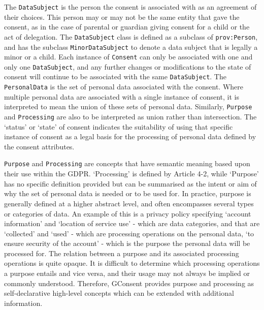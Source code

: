The \texttt{DataSubject} is the person the consent is associated with as an agreement of their choices. This person may or may not be the same entity that gave the consent, as in the case of parental or guardian giving consent for a child or the act of delegation. The \texttt{DataSubject} class is defined as a subclass of \texttt{prov:Person}, and has the subclass \texttt{MinorDataSubject} to denote a data subject that is legally a minor or a child.
Each instance of \texttt{Consent} can only be associated with one and only one \texttt{DataSubject}, and any further changes or modifications to the state of consent will continue to be associated with the same \texttt{DataSubject}.
The \texttt{PersonalData} is the set of personal data associated with the consent. Where multiple personal data are associated with a single instance of consent, it is interpreted to mean the union of these sets of personal data. Similarly, \texttt{Purpose} and \texttt{Processing} are also to be interpreted as union rather than intersection.
The `status' or `state' of consent indicates the suitability of using that specific instance of consent as a legal basis for the processing of personal data defined by the consent attributes.

\texttt{Purpose} and \texttt{Processing} are concepts that have semantic meaning based upon their use within the GDPR.
`Processing' is defined by Article 4-2, while `Purpose' has no specific definition provided but can be summarised as the intent or aim of why the set of personal data is needed or to be used for. In practice, purpose is generally defined at a higher abstract level, and often encompasses several types or categories of data. An example of this is a privacy policy specifying `account information' and `location of service use' - which are data categories, and that are `collected' and `used' - which are processing operations on the personal data, `to ensure security of the account' - which is the purpose the personal data will be processed for. The relation between a purpose and its associated processing operations is quite opaque. It is difficult to determine which processing operations a purpose entails and vice versa, and their usage may not always be implied or commonly understood. Therefore, GConsent provides purpose and processing as self-declarative high-level concepts which can be extended with additional information.


